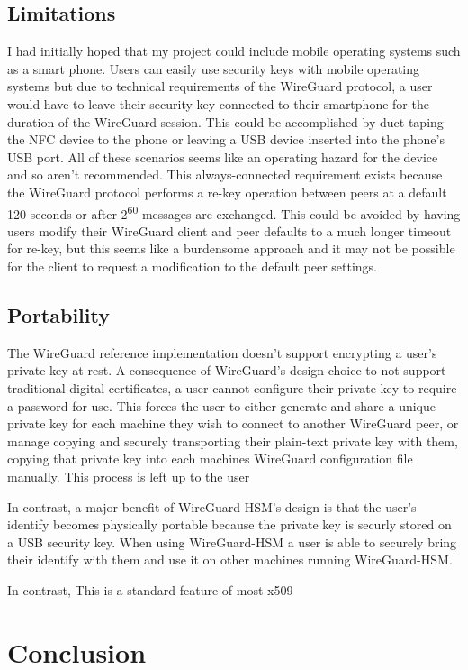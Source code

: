 \documentclass [11pt, proquest] {uwthesis}[2020/02/24]
\begin{document}
\section {Limitations}
I had initially hoped that my project could include mobile operating systems such as a smart phone. Users can easily use security keys
with mobile operating systems but due to technical requirements of the WireGuard protocol, a user would have to leave their security key connected
to their smartphone for the duration of the WireGuard session. This could be accomplished by duct-taping the NFC device to the phone or leaving a USB device inserted into the phone's USB port. All of these scenarios seems like an operating hazard for the device and so aren't recommended. This always-connected requirement exists because the WireGuard protocol performs a re-key operation between peers at a default 120 seconds 
or after 2\textsuperscript{60} messages are exchanged. This could be avoided by having users modify their WireGuard client and peer defaults to a much longer timeout for re-key, but this seems like a burdensome approach and it may not be possible for the client to request a modification to the default peer settings.

\section {Portability}

The WireGuard reference implementation doesn't support encrypting a user's private key at rest. A consequence of WireGuard's design choice to not support traditional digital certificates, a user cannot configure their private key to require a password for use. This forces the user to either generate and share a unique private key for each machine they wish to connect to another WireGuard peer, or manage copying and securely transporting their plain-text private key with them, copying that private key into each machines WireGuard configuration file manually. This process is left up to the user

In contrast, a major benefit of WireGuard-HSM's design is that the user's identify becomes physically portable because the private key is securly stored on a USB security key. When using WireGuard-HSM a user is able to securely bring their identify with them and use it on other machines running WireGuard-HSM. 

In contrast, This is a standard feature of most x509

\chapter {Conclusion}
\end{document}
